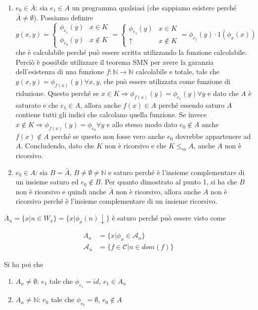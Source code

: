 \begin{enumerate}
	\item $e_0 \in \bar{A}$: sia $ e_1 \in A $ un programma qualsiasi (che sappiamo esistere perché $ \bar{A} \neq \emptyset$). Possiamo definire
	$$
	g(x,y) = \begin{cases}
	\phi_{e_1}(y) & x \in K\\
	\phi_{e_0}(y) & x \notin K
	\end{cases} = \begin{cases}
	\phi_{e_1}(y) & x \in K \\
	\uparrow & x \notin K
	\end{cases} = \phi_{e_1}(y) \cdot 1(\phi_x(x))
	$$
	che è calcolabile perché può essere scritta utilizzando la funzione calcolabile. Perciò è possibile utilizzare il teorema SMN per avere la garanzia dell'esistenza di una funzione $ f : \mathbb{N} \rightarrow \mathbb{N} $ calcolabile e totale, tale che $ g(x,y) = \phi_{f(x)}(y)  \forall x,y$, che può essere utilizzata come funzione di riduzione. Questo perché se $ x \in K \Rightarrow \phi_{f(x)}(y) = \phi_{e_1}(y) \forall y$ e dato che $ A $ è saturato e che $ e_1 \in A $, allora anche $ f(x) \in A$ perché essendo saturo $ A $ contiene tutti gli indici che calcolano quella funzione. Se invece $ x \notin K \Rightarrow \phi_{f(x)}(y) = \phi_{e_0} \forall y$ e allo stesso modo dato $ e_0 \notin A $ anche $ f(x) \notin A $ perché se questo non fosse vero anche $ e_0 $ dovrebbe appartenere ad $ A $.  Concludendo, dato che $ K $ non è ricorsivo e che $ K \leq_m A $, anche $ A $ non è ricorsivo.
	\item $e_0 \in A$: sia $ B = \bar{A} $, $ B \neq \emptyset \neq \mathbb{N} $ e saturo perché è l'insieme complementare di un insieme saturo ed $ e_0 \notin B $. Per quanto dimostrato al punto 1, si ha che $ B $ non è ricorsivo e quindi anche $ \bar{A} $ non è ricorsivo, allora anche $ A $ non è ricorsivo perché è l'insieme complementare di un insieme ricorsivo.
\end{enumerate}


$ A_n = \{ x | n \in W_x \}  = \{ x | \phi_x(n) \downarrow  \}$ è saturo perché può essere visto come

\begin{align*}
A_n &= \{ x | \phi_x \in \mathcal{A}_n \}  \\
\mathcal{A}_n &= \{ f \in \mathcal{C} | n \in dom(f) \} 
\end{align*} 

Si ha poi che 
\begin{enumerate}
	\item $ A_n \neq \emptyset $: $ e_1 $ tale che $ \phi_{e_1} = id $, $ e_1 \in A_n $ 
	\item $A_n \neq \mathbb{N}$: $e_0$ tale che $ \phi_{e_0} = \emptyset $, $ e_0 \notin A $
\end{enumerate}


